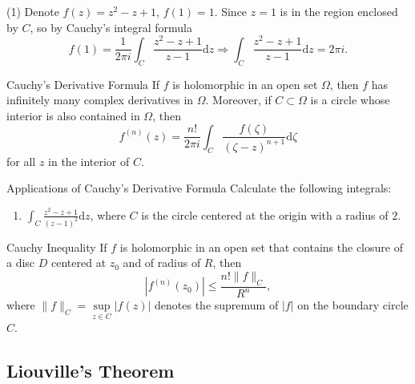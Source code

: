 \begin{solution}
  (1) Denote $f(z) = z^2 - z + 1$, $f(1) = 1$.
  Since $z = 1$ is in the region enclosed by $C$, so by Cauchy's integral formula
  \begin{equation}
    f(1) = \frac{1}{2\pi i}\int_C \frac{z^2 - z + 1}{z - 1}\mathrm{d} z
    \Rightarrow \int_C \frac{z^2 - z + 1}{z - 1}\mathrm{d}z = 2 \pi i.
  \end{equation}
\end{solution}

\begin{corollary}{Cauchy's Derivative Formula}{}
  If $f$ is holomorphic in an open set $\Omega$,
  then $f$ has infinitely many complex derivatives in $\Omega$.
  Moreover, if $C \subset \Omega$ is a circle whose interior is also contained in $\Omega$,
  then
  \begin{equation}
    f^{(n)}(z) = \frac{n!}{2 \pi i} \int_C \frac{f(\zeta)}{(\zeta - z)^{n+1}}\mathrm{d} \zeta
  \end{equation}
  for all $z$ in the interior of $C$.
\end{corollary}

\begin{example}{Applications of Cauchy's Derivative Formula}{}
  Calculate the following integrals:
  \begin{enumerate}
  \item $\int_C \frac{z^2 - z + 1}{(z-1)^2}\mathrm{d} z$,
    where $C$ is the circle centered at the origin with a radius of $2$.
  \end{enumerate}
\end{example}

\begin{solution}
  
\end{solution}

\begin{corollary}{Cauchy Inequality}{}
  If $f$ is holomorphic in an open set that contains the closure of a disc $D$
  centered at $z_0$ and of radius of $R$, then
  \begin{equation}
    |f^{(n)}(z_0)| \leq \frac{n! \|f\|_C}{R^n},
  \end{equation}
  where $\|f\|_C = \sup \limits_{z \in C}|f(z)|$ denotes the supremum of $|f|$
  on the boundary circle $C$.
\end{corollary}

\subsection{Liouville's Theorem}

